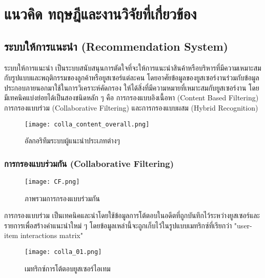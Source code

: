 \chapter{แนวคิด ทฤษฎีและงานวิจัยที่เกี่ยวข้อง}
\label{chapter:related-theory}

\section{ระบบให้การแนะนำ (Recommendation System)}
ระบบให้การแนะนำ \cite[baptiste]{baptiste} เป็นระบบสนับสนุนการตัดใจที่จะให้การแนะนำสินค้าหรือบริหารที่มีความเหมาะสมกับรูปแบบและพฤติกรรมของลูกค้าหรือยูสเซอร์แต่ละคน โดยอาศัยข้อมูลของยูสเซอร์งานร่วมกับข้อมูลประกอบภายนอกมาใช้ในการวิเคราะห์คัดกรอง ให้ได้สิ่งที่มีความหมายที่เหมาะสมกับยูสเซอร์งาน โดยมีเทคนิคแบ่งย่อยได้เป็นสองชนิดหลัก ๆ คือ การกรองแบบอิงเนื้อหา (Content Based Filtering) การกรองแบบร่วม (Collaborative Filtering) และการกรองแบบผสม (Hybrid Recognition) \cite{robin}

\begin{figure}[!h]
  \centering
  \texttt{[image: colla\_content\_overall.png]}  
  \caption{\cite[baptiste]{baptiste}อัลกอริทึมระบบผู้แนะนำประเภทต่างๆ}
  \label{Fig:cell-and-block}
\end{figure}

\subsection{การกรองแบบร่วมกัน (Collaborative Filtering)}
\begin{figure}[!h]
  \centering
  \texttt{[image: CF.png]}  
  \caption{ภาพรวมการกรองแบบร่วมกัน}
  \label{Fig:cell-and-block}
\end{figure}
การกรองแบบร่วม เป็นเทคนิคและนำโดยใช้ข้อมูลการโต้ตอบในอดีตที่ถูกบันทึกไว้ระหว่างยูสเซอร์และรายการเพื่อสร้างคำแนะนำใหม่ ๆ โดยข้อมูลเหล่านี้จะถูกเก็บไว้ในรูปแบบเมทริกซ์ที่เรียกว่า "user-item interactions matrix"
\newline
\begin{figure}[!h]
  \centering
  \texttt{[image: colla\_01.png]}  
  \caption{เมทริกซ์การโต้ตอบยูสเซอร์ไอเทม}
  \label{Fig:cell-and-block}
\end{figure}

